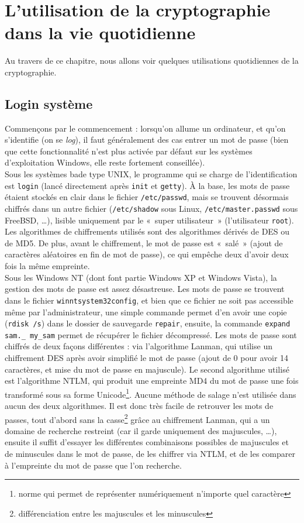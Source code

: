 \section{L'utilisation de la cryptographie dans la vie quotidienne}
Au travers de ce chapitre, nous allons voir quelques utilisations
quotidiennes de la cryptographie.
 
\subsection{Login système}
Commençons par le commencement : lorsqu'on allume un ordinateur,
et qu'on s'identifie (on se \emph{log}), il faut généralement 
des cas entrer un mot de passe (bien que cette fonctionnalité
n'est plus activée par défaut sur les systèmes d'exploitation
Windows, elle reste fortement conseillée).
\\
 
Sous les systèmes bade type UNIX, le programme qui se charge de
l'identification est \texttt{login} (lancé directement après
\texttt{init} et \texttt{getty}). À la base, les mots de passe
étaient stockés en clair dans le fichier \texttt{/etc/passwd},
mais se trouvent désormais chiffrés dans un autre
fichier (\texttt{/etc/shadow} sous Linux,
\texttt{/etc/master.passwd} sous FreeBSD, …), 
lisible uniquement par le «~super utilisateur~»
(l'utilisateur \texttt{root}).
Les algorithmes de chiffrements
utilisés sont des algorithmes dérivés de DES ou de MD5.
 De plus, avant le chiffrement, le mot
de passe est «~salé~» (ajout de caractères aléatoires en fin de
mot de passe), ce qui empêche deux d'avoir
deux fois la même empreinte.
\\
 
Sous les Windows NT (dont font partie Windows XP et Windows
Vista), la gestion des mots de passe est assez désastreuse. Les
mots de passe se trouvent dans le fichier
\texttt{\bslash winnt\bslash system32\bslash config}, et bien
que ce fichier ne soit pas
accessible même par l'administrateur, une simple commande permet
d'en avoir une copie (\texttt{rdisk /s}) dans le dossier de
sauvegarde \texttt{repair}, ensuite, la commande \texttt{expand
sam.\_ my\_sam}
permet de récupérer le fichier décompressé.
Les mots de passe sont chiffrés de deux façons différentes : via
l'algorithme Lanman, qui utilise un chiffrement DES après avoir
simplifié le mot de passe (ajout de 0 pour avoir 14 caractères, et
mise du mot de passe en majuscule).
Le second algorithme utilisé est l'algorithme NTLM, qui produit
une empreinte MD4 du mot de passe une fois transformé sous sa
forme Unicode\footnote{norme qui permet de représenter
numériquement n'importe quel caractère}.
 Aucune méthode de salage n'est utilisée dans aucun
des deux algorithmes. Il est donc très facile de retrouver les
mots de passes, tout d'abord sans la casse\footnote{différenciation
entre les majuscules et les minuscules} grâce au chiffrement
Lanman, qui a un domaine de recherche restreint (car il garde 
uniquement des
majuscules, …), ensuite il suffit d'essayer les différentes
combinaisons possibles de majuscules et de minuscules dans le mot
de passe, de les chiffrer via NTLM, et de les comparer à
l'empreinte du mot de passe que l'on recherche. 
\\
 
